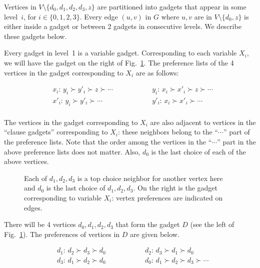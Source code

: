 \documentclass{llncs}
\begin{document}
Vertices in $V \setminus \{d_0,d_1,d_2,d_3,z\}$ are partitioned into gadgets that appear in some level~$i$, for $i \in \{0,1,2,3\}$.
Every edge $(u,v)$ in $G$ where $u, v$ are in $V \setminus \{d_0,z\}$ is either inside a gadget
or between 2 gadgets in consecutive levels. We describe these gadgets below.


\medskip

 Every gadget in level~1 is a variable gadget.
Corresponding to each variable $X_i$, we will have the gadget on the right of Fig.~\ref{level1:example}. 
The preference lists of the 4 vertices in the gadget corresponding to $X_i$ are as follows:

\begin{minipage}[c]{0.45\textwidth}
			
			\centering
			\begin{align*}
			        &x_i\colon \, y_i \succ y'_i \succ  z \succ \cdots   \qquad\qquad &&  y_i\colon \, x_i \succ x'_i \succ z \succ \cdots \\
                                &x'_i\colon \, y_i \succ y'_i \succ \cdots   \qquad\qquad &&  y'_i\colon \, x_i \succ x'_i \succ \cdots\\
			\end{align*}
\end{minipage}

\smallskip

The vertices in the gadget corresponding to $X_i$ are also adjacent to vertices in the ``clause gadgets'' corresponding to $X_i$:
these neighbors belong to the ``$\cdots$'' part of the preference lists. Note that the order among the vertices in the ``$\cdots$'' part
in the above preference lists does not matter.  Also, $d_0$ is the last choice of each of the above vertices.

\begin{figure}[h]
\centerline{\resizebox{0.46\textwidth}{!}{}}
\caption{Each of $d_1,d_2,d_3$ is a top choice neighbor for another vertex here and $d_0$ is the last choice of $d_1,d_2,d_3$.
On the right is the gadget corresponding to variable $X_i$: vertex preferences are indicated on edges.}
\label{level1:example}
\end{figure}

There will be 4 vertices $d_0,d_1,d_2,d_3$ that form the gadget $D$ (see the left of Fig.~\ref{level1:example}).
The preferences of vertices in $D$ are given below.

\begin{minipage}[c]{0.45\textwidth}
			
			\centering
			\begin{align*}
				&d_1\colon \, d_2  \succ d_3 \succ d_0  \qquad\qquad && d_2\colon \, d_3  \succ d_1 \succ d_0\\
			        &d_3\colon \, d_1 \succ d_2 \succ d_0  \qquad\qquad && d_0\colon \, d_1 \succ d_2 \succ d_3 \succ \cdots \\
			\end{align*}
\end{minipage}
\end{document}
